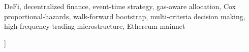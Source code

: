 \documentclass[twocolumn, 10pt]{article}
\begin{document}
\begin{keyword}
DeFi, decentralized finance, event-time strategy, gas-aware allocation,
Cox proportional-hazards, walk-forward bootstrap, multi-criteria decision
making, high-frequency-trading microstructure, Ethereum mainnet
\end{keyword}
]










{\footnotesize
\let\oldthebibliography\thebibliography
\renewcommand{\thebibliography}[1]{%
  \oldthebibliography{#1}%
  \setlength{\itemsep}{1pt plus 0.5ex}%
  \setlength{\parsep}{0pt}%
}


}
\end{document}

